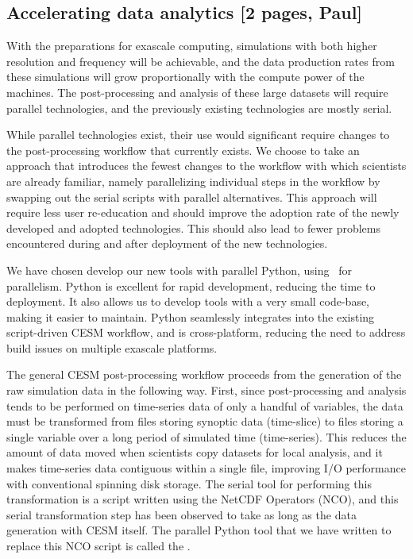 \subsection{Accelerating data analytics [2 pages, Paul]}\label{sec:postproc}

With the preparations for exascale computing, simulations with both higher resolution and frequency will be achievable, and the data production rates from these simulations will grow proportionally with the compute power of the machines.  The post-processing and analysis of these large datasets will require parallel technologies, and the previously existing technologies are mostly serial.  

While parallel technologies exist, their use would significant require changes to the post-processing workflow that currently exists.  We choose to take an approach that introduces the fewest changes to the workflow with which scientists are already familiar, namely parallelizing individual steps in the workflow by swapping out the serial scripts with parallel alternatives.  This approach will require less user re-education and should improve the adoption rate of the newly developed and adopted technologies.  This should also lead to fewer problems encountered during and after deployment of the new technologies.

We have chosen develop our new tools with parallel Python, using \mpipy\ for parallelism.  Python is excellent for rapid development, reducing the time to deployment.  It also allows us to develop tools with a very small code-base, making it easier to maintain.  Python seamlessly integrates into the existing script-driven CESM workflow, and is cross-platform, reducing the need to address build issues on multiple exascale platforms.

The general CESM post-processing workflow proceeds from the generation of the raw simulation data in the following way.  First, since post-processing and analysis tends to be performed on time-series data of only a handful of variables, the data must be transformed from files storing synoptic data (time-slice) to files storing a single variable over a long period of simulated time (time-series).  This reduces the amount of data moved when scientists copy datasets for local analysis, and it makes time-series data contiguous within a single file, improving I/O performance with conventional spinning disk storage.  The serial tool for performing this transformation is a script written using the NetCDF Operators (NCO), and this serial transformation step has been observed to take as long as the data generation with CESM itself.  The parallel Python tool that we have written to replace this NCO script is called the \pyreshaper.

